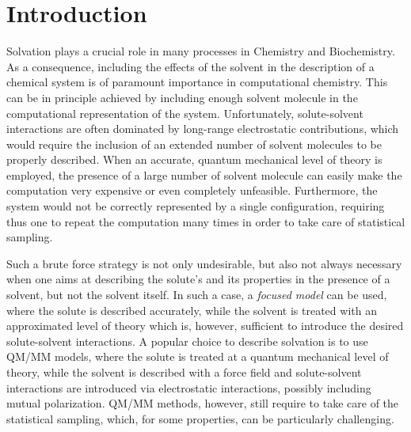 \section{Introduction}\label{sec:intro}
Solvation plays a crucial role in many processes in Chemistry and Biochemistry. As a consequence, including the effects of the solvent in the description of a chemical system is of paramount importance in computational chemistry. This can be in principle achieved by including enough solvent molecule in the computational representation of the system. Unfortunately, solute-solvent interactions are often dominated by long-range electrostatic contributions, which would require the inclusion of an extended number of solvent molecules to be properly described. When an accurate, quantum mechanical level of theory is employed, the presence of a large number of solvent molecule can easily make the computation very expensive or even completely unfeasible. Furthermore, the system would not be correctly represented by a single configuration, requiring thus one to repeat the computation many times in order to take care of statistical sampling. 

Such a brute force strategy is not only undesirable, but also not always necessary when one aims at describing the solute's and its properties in the presence of a solvent, but not the solvent itself. In such a case, a \textit{focused model} can be used, where the solute is described accurately, while the solvent is treated with an approximated level of theory which is, however, sufficient to introduce the desired solute-solvent interactions. 
A popular choice to describe solvation is to use QM/MM models\cite{Warshel_JMB_QMMM,Warshel_JACS_QMMM,Gao_Science_QMMM,Bakowies_JPC_QMMM,Truhlar_TCA_QMMMReview,Thiel_ACIE_QMMMReview,
Barone_Libro_QMMM,Morokuma_CR_ONIOM,Cappelli_IJQC_FQRev}, where the solute is treated at a quantum mechanical level of theory, while the solvent is described with a force field and solute-solvent interactions are introduced via electrostatic interactions, possibly including mutual polarization\cite{Curutchet_JCTC_MMPol,Kongsted_JCTC_MMPExc,Christiansen_JCTC_MMPExcCCDFT,Steindal_PCCP_MMPExc,Caprasecca_JCTC_FMM,Lipparini_JCP_FQMag,Lipparini_JCTC_FQTD,Boulanger_JCTC_Drude,Boulanger_JCTC_QMMMPolPCM,Loco_JCTC_QMAMOEBA}. QM/MM methods, however, still require to take care of the statistical sampling, which, for some properties, can be particularly challenging\cite{Lipparini_JCTC_ORMoxy,Giovannini_JCTC_FQVCD,Giovannini_JCTC_FQROA}.

